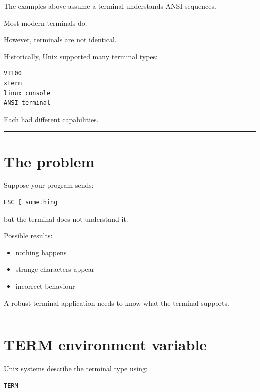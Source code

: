 \documentclass[
  oneside,
  openany]{book}
\providecommand{\tightlist}{%
  \setlength{\itemsep}{0pt}\setlength{\parskip}{0pt}}
\begin{document}
The examples above assume a terminal understands ANSI sequences.

Most modern terminals do.

However, terminals are not identical.

Historically, Unix supported many terminal types:

\begin{verbatim}
VT100
xterm
linux console
ANSI terminal
\end{verbatim}

Each had different capabilities.

\begin{center}\rule{0.5\linewidth}{0.5pt}\end{center}

\hypertarget{the-problem}{%
\section{The problem}\label{the-problem}}

Suppose your program sends:

\begin{verbatim}
ESC [ something
\end{verbatim}

but the terminal does not understand it.

Possible results:

\begin{itemize}
\tightlist
\item
  nothing happens
\item
  strange characters appear
\item
  incorrect behaviour
\end{itemize}

A robust terminal application needs to know what the terminal supports.

\begin{center}\rule{0.5\linewidth}{0.5pt}\end{center}

\hypertarget{term-environment-variable}{%
\section{TERM environment variable}\label{term-environment-variable}}

Unix systems describe the terminal type using:

\begin{verbatim}
TERM
\end{verbatim}
\end{document}
